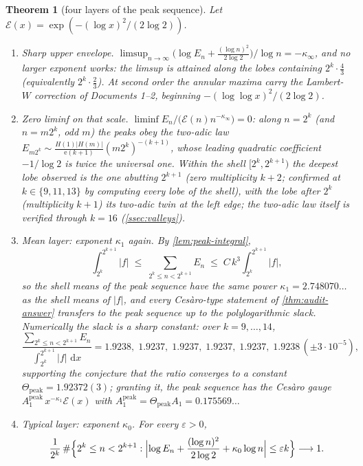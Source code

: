 \documentclass[11pt,oneside]{article}
\newtheorem{theorem}{Theorem}[section]
\theoremstyle{definition}
\theoremstyle{remark}
\newcommand{\e}{\mathrm e}
\newcommand{\dd}{\,\mathrm d}
\begin{document}
\begin{theorem}[four layers of the peak sequence]
\label{thm:peak-layers}
Let $\mathcal E(x)=\exp(-(\log x)^2/(2\log2))$.
\begin{enumerate}
\item \emph{Sharp upper envelope.}
$\limsup_{n\to\infty}\bigl(\log E_n+\tfrac{(\log n)^2}{2\log2}\bigr)/\log
n=-\kappa_\infty$, and no larger exponent works: the limsup is attained
along the lobes containing $2^k\cdot\tfrac43$ (equivalently
$2^k\cdot\tfrac23$).  At second order the annular maxima carry the
Lambert-$W$ correction of Documents 1--2, beginning
$-(\log\log x)^2/(2\log2)$.
\item \emph{Zero liminf on that scale.}
$\liminf E_n/\bigl(\mathcal E(n)n^{-\kappa_\infty}\bigr)=0$: along
$n=2^k$ (and $n=m2^k$, odd $m$) the peaks obey the two-adic law
$E_{m2^k}\sim\frac{H(1)|H(m)|}{\e(k+1)}(m2^k)^{-(k+1)}$, whose leading
quadratic coefficient $-1/\log2$ is twice the universal one.  Within the
shell $[2^k,2^{k+1})$ the deepest lobe observed is the one abutting
$2^{k+1}$ (zero multiplicity $k+2$; confirmed at $k\in\{9,11,13\}$ by
computing every lobe of the shell), with the lobe after $2^k$
(multiplicity $k+1$) its two-adic twin at the left edge; the two-adic
law itself is verified through $k=16$ (\cref{ssec:valleys}).
\item \emph{Mean layer: exponent $\kappa_1$ again.}  By
\cref{lem:peak-integral},
\[
 \int_{2^k}^{2^{k+1}}|f|\;\le\;\sum_{2^k\le n<2^{k+1}}E_n
 \;\le\;C\,k^{3}\int_{2^k}^{2^{k+1}}|f|,
\]
so the shell means of the peak sequence have the same power
$\kappa_1=2.748070\ldots$ as the shell means of $|f|$, and every
Ces\`aro-type statement of \cref{thm:audit-answer} transfers to the peak
sequence up to the polylogarithmic slack.  Numerically the slack is a
sharp constant: over $k=9,\dots,14$,
\[
 \frac{\sum_{2^k\le n<2^{k+1}}E_n}{\int_{2^k}^{2^{k+1}}|f|\,\dd x}
 =1.9238,\;1.9237,\;1.9237,\;1.9237,\;1.9237,\;1.9238\,(\pm3\cdot10^{-5}),
\]
supporting the conjecture that the ratio converges to a constant
$\Theta_{\mathrm{peak}}=1.92372(3)$; granting it, the peak sequence has
the Ces\`aro gauge $A_1^{\mathrm{peak}}\,x^{-\kappa_1}\mathcal E(x)$ with
$A_1^{\mathrm{peak}}=\Theta_{\mathrm{peak}}A_1=0.175569\ldots$
\item \emph{Typical layer: exponent $\kappa_0$.}  For every
$\varepsilon>0$,
\[
 \frac{1}{2^k}\,\#\Bigl\{2^k\le n<2^{k+1}:
 \Bigl|\log E_n+\frac{(\log n)^2}{2\log2}+\kappa_0\log n\Bigr|
 \le\varepsilon k\Bigr\}\longrightarrow1 .
\]
\end{enumerate}
\end{theorem}
\end{document}
